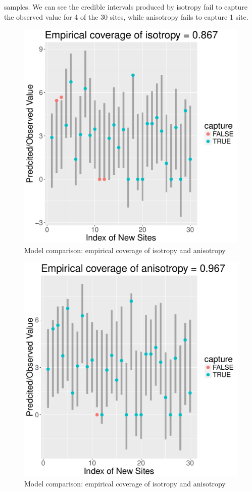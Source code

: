 \documentclass[12pt,twoside]{dukestatscithesis}
\theoremstyle{definition}
\theoremstyle{definition}
\theoremstyle{definition}
\theoremstyle{remark}
\begin{document}
samples. We can see the credible intervals produced by isotropy fail to
capture the observed value for 4 of the 30 sites, while anisotropy fails
to capture 1 site.
\begin{figure}
\includegraphics[scale=0.7]{figure/empCovIso} \caption{Model comparison: empirical coverage of isotropy and anisotropy}\label{fig:EC}
\end{figure}
\begin{figure}
\includegraphics[scale=0.7]{figure/empCovAniso} \caption{Model comparison: empirical coverage of isotropy and anisotropy}\label{fig:EC2}
\end{figure}
\end{document}
